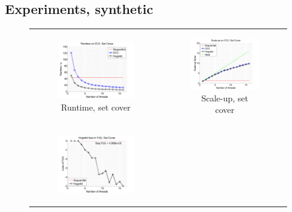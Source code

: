 \documentclass{article} %
\begin{document}
\subsection{Experiments, synthetic}
\begin{figure}[ht]
  \centering
  \begin{tabular}{cc}
	  \begin{subfigure}[b]{0.5\textwidth}
	  	\includegraphics[width=200pt]{images/runtime_setcover_500000.png}
			\caption{Runtime, set cover}
			\label{fig:runtime_setcover}
	  \end{subfigure} &
	  \begin{subfigure}[b]{0.5\textwidth}
	  	\includegraphics[width=200pt]{images/scaleup_setcover_500000.png}
			\caption{Scale-up, set cover}
			\label{fig:scale_setcover}
	  \end{subfigure} \\
	  \begin{subfigure}[b]{0.5\textwidth}
	  	\includegraphics[width=200pt]{images/diffFA_Hogwild_setcover_500000.png}

\end{subfigure}
\end{tabular}
\end{figure}
\end{document}
